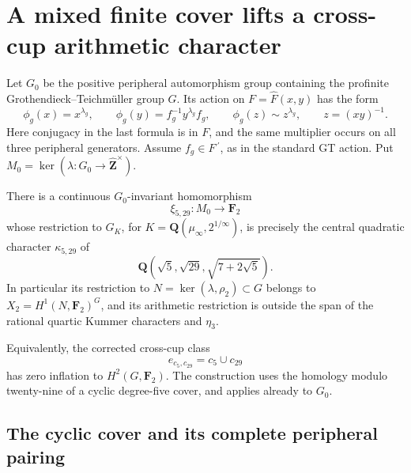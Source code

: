 \section{A mixed finite cover lifts a cross-cup arithmetic character}
\label{sec:cross-cup-five-twenty-nine-lift}

Let \(G_0\) be the positive peripheral automorphism group
containing the profinite Grothendieck--Teichm\"uller group
\(G\). Its action on \(F=\widehat F(x,y)\) has the form
\begin{equation}
 \phi_g(x)=x^{\lambda_g},\qquad
 \phi_g(y)=f_g^{-1}y^{\lambda_g}f_g,\qquad
 \phi_g(z)\sim z^{\lambda_g},\qquad z=(xy)^{-1}.
                                                               \label{eq:cross-cup-5-29-1}
\end{equation}
Here conjugacy in the last formula is in \(F\), and the
same multiplier occurs on all three peripheral generators.
Assume \(f_g\in F\,{}^{\prime}\), as in the standard GT action. Put \(M_0=\ker(\lambda:G_0\to\widehat{\mathbf Z}^{\times})\).

\begin{theorem}\label{thm:five-twenty-nine-cross-cup-lift}
There is a continuous \(G_0\)-invariant homomorphism
\begin{equation}
                    \xi_{5,29}:M_0\longrightarrow\mathbf F_2
                                                               \label{eq:cross-cup-5-29-2}
\end{equation}
whose restriction to \(G_K\), for
\(K=\mathbf Q(\mu_\infty,2^{1/\infty})\), is precisely the
central quadratic character \(\kappa_{5,29}\) of
\[
 \mathbf Q\!\left(\sqrt5,\sqrt{29},\sqrt{7+2\sqrt5}\right).
\]
In particular its restriction to
\(N=\ker(\lambda,\rho_2)\subset G\) belongs to
\(X_2=H^1(N,\mathbf F_2)^G\), and its arithmetic restriction
is outside the span of the rational quartic Kummer
characters and \(\eta_3\).

Equivalently, the corrected cross-cup class
\begin{equation}
                         e_{c_5,c_{29}}=c_5\cup c_{29}
                                                               \label{eq:cross-cup-5-29-3}
\end{equation}
has zero inflation to \(H^2(G,\mathbf F_2)\).
The construction uses the homology modulo twenty-nine of
a cyclic degree-five cover, and applies already to \(G_0\).
\end{theorem}

\subsection{The cyclic cover and its complete peripheral pairing}

